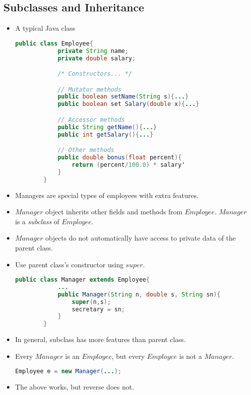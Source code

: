 \documentclass[a4paper]{article}
\begin{document}
\subsection{Subclasses and Inheritance}
\begin{itemize}
    \item A typical Java class
    \begin{lstlisting}[language=Java]
        public class Employee{
            private String name;
            private double salary;

            /* Constructors... */

            // Mutator methods
            public boolean setName(String s){...}
            public boolean set Salary(double x){...}

            // Accessor methods
            public String getName(){...}
            public int getSalary(){...}

            // Other methods
            public double bonus(float percent){
                return (percent/100.0) * salary'
            }
        }
    \end{lstlisting}
    \item Managers are special types of employees with extra features.
    \item $Manager$ object inherits other fields and methods from $Employee$. $Manager$ is a \textit{subclass} of $Employee$.
    \item $Manager$ objects do not automatically have access to private data of the parent class.
    \item Use parent class's constructor using $super$.
    \begin{lstlisting}[language=Java]
        public class Manager extends Employee{
            ...
            public Manager(String n, double s, String sn){
                super(n,s);
                secretary = sn;
            }
        }
    \end{lstlisting}
    \item In general, subclass has more features than parent class.
    \item Every $Manager$ is an $Employee$, but every $Employee$ is not a $Manager$.
    \begin{lstlisting}[language=Java]
        Employee e = new Manager(...);
    \end{lstlisting}
    \item The above works, but reverse does not.
\end{itemize}
\end{document}
